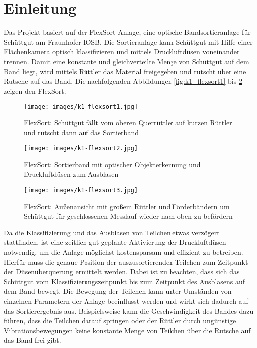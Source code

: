 \section{Einleitung}

Das Projekt basiert auf der FlexSort-Anlage, eine optische Bandsortieranlage für Schüttgut am Fraunhofer IOSB. Die Sortieranlage kann Schüttgut mit Hilfe einer Flächenkamera optisch klassifizieren und mittels Druckluftdüsen voneinander trennen. Damit eine konstante und gleichverteilte Menge von Schüttgut auf dem Band liegt, wird mittels Rüttler das Material freigegeben und rutscht über eine Rutsche auf das Band. Die nachfolgenden Abbildungen \ref{fig:k1_flexsort1} bis \ref{fig:k1_flexsort3} zeigen den FlexSort.

\begin{figure}[htb]
	\centering
	\begin{minipage}[t]{0.4\linewidth}
		\centering
		\texttt{[image: images/k1-flexsort1.jpg]}
		\caption{FlexSort: Schüttgut fällt vom oberen Querrüttler auf kurzen Rüttler und rutscht dann auf das Sortierband}
		\label{fig:k1_flexsort1}
	\end{minipage}%
	\hfill
	\begin{minipage}[t]{0.54\linewidth}
		\centering
		\texttt{[image: images/k1-flexsort2.jpg]}
		\caption{FlexSort: Sortierband mit optischer Objekterkennung und Druckluftdüsen zum Ausblasen}
		\label{fig:k1_flexsort2}
	\end{minipage}
\end{figure}

\begin{figure}[htb]
	\centering
	\texttt{[image: images/k1-flexsort3.jpg]}
	\caption{FlexSort: Außenansicht mit großem Rüttler und Förderbändern um Schüttgut für geschlossenen Messlauf wieder nach oben zu befördern}
	\label{fig:k1_flexsort3}
\end{figure}
 
Da die Klassifizierung und das Ausblasen von Teilchen etwas verzögert stattfinden, ist eine zeitlich gut geplante Aktivierung der Druckluftdüsen notwendig, um die Anlage möglichst kostensparsam und effizient zu betreiben. Hierfür muss die genaue Position der auszusortierenden Teilchen zum Zeitpunkt der Düsenüberquerung ermittelt werden. Dabei ist zu beachten, dass sich das Schüttgut vom Klassifizierungszeitpunkt bis zum Zeitpunkt des Ausblasens auf dem Band bewegt. Die Bewegung der Teilchen kann unter Umständen von einzelnen Parametern der Anlage beeinflusst werden und wirkt sich dadurch auf das Sortierergebnis aus. Beispielsweise kann die Geschwindigkeit des Bandes dazu führen, dass die Teilchen darauf springen oder der Rüttler durch ungünstige Vibrationsbewegungen keine konstante Menge von Teilchen über die Rutsche auf das Band frei gibt. 

